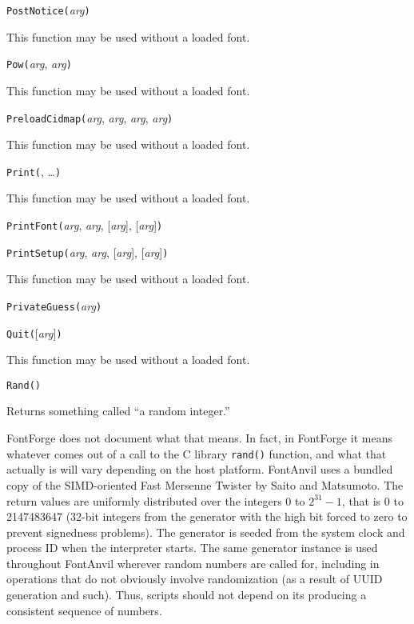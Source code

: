 
\noindent\texttt{PostNotice(}\textit{arg}\texttt{)}

This function may be used without a loaded font.


\noindent\texttt{Pow(}\textit{arg}, \textit{arg}\texttt{)}

This function may be used without a loaded font.


\noindent\texttt{PreloadCidmap(}\textit{arg}, \textit{arg}, \textit{arg}, \textit{arg}\texttt{)}

This function may be used without a loaded font.


\noindent\texttt{Print(}, \ldots\texttt{)}

This function may be used without a loaded font.


\noindent\texttt{PrintFont(}\textit{arg}, \textit{arg}, [\textit{arg}], [\textit{arg}]\texttt{)}


\noindent\texttt{PrintSetup(}\textit{arg}, \textit{arg}, [\textit{arg}], [\textit{arg}]\texttt{)}

This function may be used without a loaded font.


\noindent\texttt{PrivateGuess(}\textit{arg}\texttt{)}


\noindent\texttt{Quit(}[\textit{arg}]\texttt{)}

This function may be used without a loaded font.


\noindent\texttt{Rand()}

Returns something called ``a random integer.''

FontForge \FFdiff does not document what that means.  In fact, in FontForge
it means whatever comes out of a call to the C
library \texttt{rand()} function, and what that actually is will vary
depending on the host platform.  FontAnvil uses a bundled copy of the
SIMD-oriented Fast Mersenne Twister by Saito and Matsumoto.  The return
values are uniformly distributed over the integers 0 to $2^{31}-1$, that is
0 to 2147483647 (32-bit integers from the generator with the high bit forced
to zero to prevent signedness problems).  The generator is seeded from the
system clock and process ID when the interpreter starts.  The same generator
instance is used throughout FontAnvil wherever random numbers are called
for, including in operations that do not obviously involve randomization (as
a result of UUID generation and such).  Thus, scripts should not depend on
its producing a consistent sequence of numbers.

